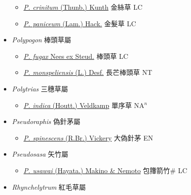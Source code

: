 \begin{itemize}
  \begin{itemize}
        \item[] \href{http://www.theplantlist.org/tpl1.1/search?q=Pogonatherum+crinitum}{\textit{P. crinitum} (Thunb.) Kunth}   金絲草 LC
        \item[] \href{http://www.theplantlist.org/tpl1.1/search?q=Pogonatherum+paniceum}{\textit{P. paniceum} (Lam.) Hack.}   金髮草 LC
  \end{itemize}
 \item[] \textit{Polypogon} 棒頭草屬
                    
  \begin{itemize}
        \item[] \href{http://www.theplantlist.org/tpl1.1/search?q=Polypogon+fugax}{\textit{P. fugax} Nees ex Steud.}   棒頭草 LC
        \item[] \href{http://www.theplantlist.org/tpl1.1/search?q=Polypogon+monspeliensis}{\textit{P. monspeliensis} (L.) Desf.}   長芒棒頭草 NT
  \end{itemize}
 \item[] \textit{Polytrias} 三穗草屬
                    
  \begin{itemize}
        \item[] \href{http://www.theplantlist.org/tpl1.1/search?q=Polytrias+indica}{\textit{P. indica} (Houtt.) Veldkamp}   單序草 NA$^n$
  \end{itemize}
 \item[] \textit{Pseudoraphis} 偽針茅屬
                    
  \begin{itemize}
        \item[] \href{http://www.theplantlist.org/tpl1.1/search?q=Pseudoraphis+spinescens}{\textit{P. spinescens} (R.Br.) Vickery}   大偽針茅 EN
  \end{itemize}
 \item[] \textit{Pseudosasa} 矢竹屬
                    
  \begin{itemize}
        \item[] \href{http://www.theplantlist.org/tpl1.1/search?q=Pseudosasa+usawai}{\textit{P. usawai} (Hayata.) Makino \& Nemoto}     包籜箭竹\# LC
  \end{itemize}
 \item[] \textit{Rhynchelytrum} 紅毛草屬
                    

\end{itemize}
